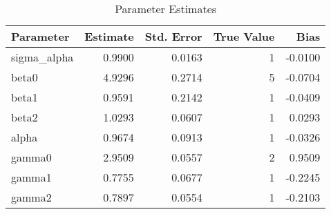 \begin{table}
\caption{Parameter Estimates}
\begin{tabular}{lrrrr}
\toprule
Parameter & Estimate & Std. Error & True Value & Bias \\
\midrule
sigma_alpha & 0.9900 & 0.0163 & 1 & -0.0100 \\
beta0 & 4.9296 & 0.2714 & 5 & -0.0704 \\
beta1 & 0.9591 & 0.2142 & 1 & -0.0409 \\
beta2 & 1.0293 & 0.0607 & 1 & 0.0293 \\
alpha & 0.9674 & 0.0913 & 1 & -0.0326 \\
gamma0 & 2.9509 & 0.0557 & 2 & 0.9509 \\
gamma1 & 0.7755 & 0.0677 & 1 & -0.2245 \\
gamma2 & 0.7897 & 0.0554 & 1 & -0.2103 \\
\bottomrule
\end{tabular}
\end{table}
